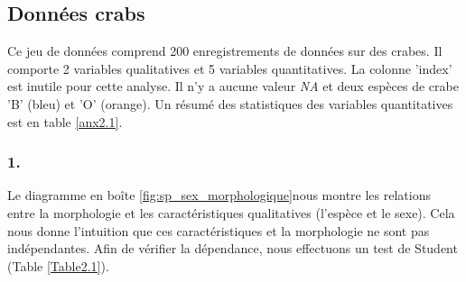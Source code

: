 \documentclass{article}
\begin{document}


\subsection{Données crabs}
Ce jeu de données comprend 200 enregistrements de données sur des crabes. Il comporte 2 variables qualitatives et 5 variables quantitatives. La colonne 'index' est inutile pour cette analyse.
Il n'y a aucune valeur \textit{NA} et deux espèces de crabe 'B' (bleu) et 'O' (orange). Un résumé des statistiques des variables quantitatives est en table \ref{anx2.1}.

\subsubsection*{1.}\label{1.2.1}





Le diagramme en boîte \lbrack\ref{fig:sp_sex_morphologique}\rbrack nous montre les relations entre la morphologie et les caractéristiques qualitatives (l'espèce et le sexe). Cela nous donne l'intuition que ces caractéristiques et la morphologie ne sont pas indépendantes. Afin de vérifier la dépendance, nous effectuons un test de Student (Table \lbrack\ref{Table2.1}\rbrack).
\end{document}
